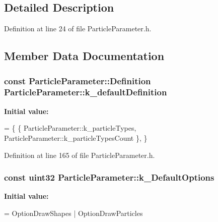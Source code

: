\subsection{Detailed Description}


Definition at line 24 of file Particle\-Parameter.\-h.



\subsection{Member Data Documentation}
\hypertarget{classParticleParameter_a776962c86534907e7448b3f85a6e802c}{
\subsubsection[{k\-\_\-default\-Definition}]{\setlength{\rightskip}{0pt plus 5cm}const {\bf Particle\-Parameter\-::\-Definition} Particle\-Parameter\-::k\-\_\-default\-Definition\hspace{0.3cm}{\ttfamily [static]}}}\label{classParticleParameter_a776962c86534907e7448b3f85a6e802c}
{\bfseries Initial value\-:}
\begin{DoxyCode}
=
\{
    \{
        ParticleParameter::k\_particleTypes,
        ParticleParameter::k\_particleTypesCount
    \},
\}
\end{DoxyCode}


Definition at line 165 of file Particle\-Parameter.\-h.

\hypertarget{classParticleParameter_adb8019844d1cfbec2b7eff0e1fd39bc5}{
\subsubsection[{k\-\_\-\-Default\-Options}]{\setlength{\rightskip}{0pt plus 5cm}const uint32 Particle\-Parameter\-::k\-\_\-\-Default\-Options\hspace{0.3cm}{\ttfamily [static]}}}\label{classParticleParameter_adb8019844d1cfbec2b7eff0e1fd39bc5}
{\bfseries Initial value\-:}
\begin{DoxyCode}
=
    OptionDrawShapes | OptionDrawParticles
\end{DoxyCode}


